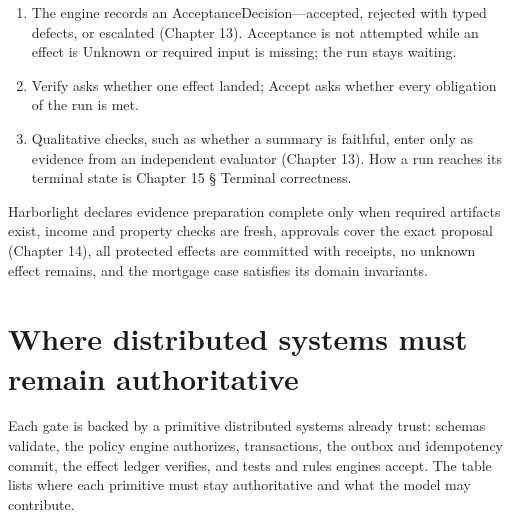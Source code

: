 \begin{enumerate}

\item The engine records an AcceptanceDecision—accepted, rejected with typed defects, or escalated (Chapter 13). Acceptance is not attempted while an effect is Unknown or required input is missing; the run stays waiting.

\item Verify asks whether one effect landed; Accept asks whether every obligation of the run is met.

\item Qualitative checks, such as whether a summary is faithful, enter only as evidence from an independent evaluator (Chapter 13). How a run reaches its terminal state is Chapter 15 § Terminal correctness.

\end{enumerate}

Harborlight declares evidence preparation complete only when required artifacts exist, income and property checks are fresh, approvals cover the exact proposal (Chapter 14), all protected effects are committed with receipts, no unknown effect remains, and the mortgage case satisfies its domain invariants.\par

\section{Where distributed systems must remain authoritative}

Each gate is backed by a primitive distributed systems already trust: schemas validate, the policy engine authorizes, transactions, the outbox and idempotency commit, the effect ledger verifies, and tests and rules engines accept. The table lists where each primitive must stay authoritative and what the model may contribute.\par

